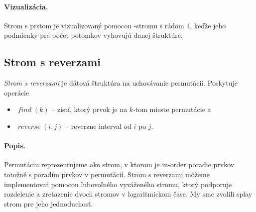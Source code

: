 
\paragraph{Vizualizácia.}
Strom s prstom je vizualizovaný pomocou \Bp-stromu s rádom 4, keďže jeho podmienky pre počet potomkov vyhovujú
danej štruktúre.



\def\find{$\mathop{find}(k)$}

\subsection{Strom s reverzami}
\emph{Strom s reverzami} je dátová štruktúra na uchovávanie permutácií.
Poskytuje operácie
\begin{itemize}
\item $\mathop{\mathit{find}}(k)$ -- zistí, ktorý prvok je na $k$-tom mieste permutácie a
\item $\mathop{\mathit{reverse}}(i,j)$ -- reverzne interval od $i$ po $j$.
\end{itemize}

\paragraph{Popis.}
Permutáciu reprezentujeme ako strom, v ktorom je in-order poradie prvkov totožné
s poradím prvkov v permutácií. Strom s reverzami môžeme implementovať pomocou ľubovoľného
vyváženého stromu, ktorý podporuje rozdelenie a zreťazenie dvoch stromov v logaritmickom čase.
My sme zvolili splay strom pre jeho jednoduchosť.


